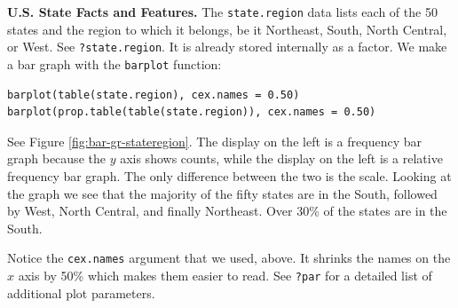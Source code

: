\documentclass[captions=tableheading]{scrbook}
\begin{document}
\begin{example}
\textbf{U.S. State Facts and Features.} The \texttt{state.region} data lists each of the 50 states and the region to which it belongs, be it Northeast, South, North Central, or West. See \texttt{?state.region}. It is already stored internally as a factor. We make a bar graph with the \texttt{barplot} function: 



\begin{verbatim}
barplot(table(state.region), cex.names = 0.50)
barplot(prop.table(table(state.region)), cex.names = 0.50)
\end{verbatim}

See Figure \ref{fig:bar-gr-stateregion}. The display on the left is a frequency bar graph because the \(y\) axis shows counts, while the display on the left is a relative frequency bar graph. The only difference between the two is the scale. Looking at the graph we see that the majority of the fifty states are in the South, followed by West, North Central, and finally Northeast. Over 30\% of the states are in the South.

Notice the \texttt{cex.names} argument that we used, above. It shrinks the names on the \(x\) axis by 50\% which makes them easier to read. See \texttt{?par} for a detailed list of additional plot parameters.








\end{example}
\end{document}
